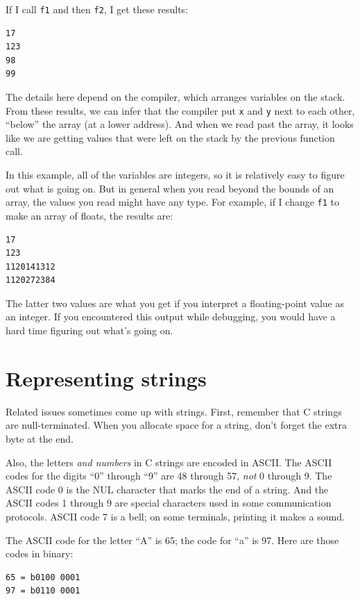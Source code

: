 \documentclass[12pt]{book}
\begin{document}
If I call {\tt f1} and then {\tt f2}, I get these results:

\begin{verbatim}
17
123
98
99
\end{verbatim}

The details here depend on the compiler, which arranges variables
on the stack.  From these results, we can infer that the
compiler put {\tt x} and {\tt y} next to each other, ``below''
the array (at a lower address).  And when we read past the
array, it looks like we are getting values that were left on
the stack by the previous function call.

In this example, all of the variables are integers, so it is
relatively easy to figure out what is going on.  But in general
when you read beyond the bounds of an array, the values you
read might have any type.  For example, if I change {\tt f1}
to make an array of floats, the results are:

\begin{verbatim}
17
123
1120141312
1120272384
\end{verbatim}

The latter two values are what you get if you interpret a
floating-point value as an integer.  If you encountered this output
while debugging, you would have a hard time figuring out what's
going on.


\section{Representing strings}

Related issues sometimes come up with strings.  First, remember
that C strings are null-terminated.  When you allocate space
for a string, don't forget the extra byte at the end.

Also, the letters {\it and numbers} in C strings are
encoded in ASCII.  The ASCII codes for the digits ``0'' through ``9''
are 48 through 57, {\it not} 0 through 9.  The ASCII code 0 is the NUL
character that marks the end of a string.  And the ASCII codes 1
through 9 are special characters used in some communication protocols.
ASCII code 7 is a bell; on some terminals, printing it makes a sound.

The ASCII code for the letter ``A'' is 65; the code for
``a'' is 97.  Here are those codes in binary:

\begin{verbatim}
65 = b0100 0001
97 = b0110 0001
\end{verbatim}
\end{document}

